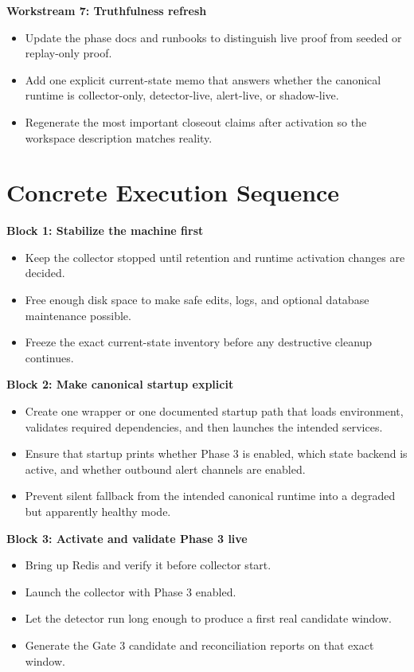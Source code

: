 \documentclass{article}
\begin{document}
\textbf{Workstream 7: Truthfulness refresh}
\begin{itemize}
\item Update the phase docs and runbooks to distinguish live proof from seeded or replay-only proof.
\item Add one explicit current-state memo that answers whether the canonical runtime is collector-only, detector-live, alert-live, or shadow-live.
\item Regenerate the most important closeout claims after activation so the workspace description matches reality.
\end{itemize}

\section*{Concrete Execution Sequence}
\textbf{Block 1: Stabilize the machine first}
\begin{itemize}
\item Keep the collector stopped until retention and runtime activation changes are decided.
\item Free enough disk space to make safe edits, logs, and optional database maintenance possible.
\item Freeze the exact current-state inventory before any destructive cleanup continues.
\end{itemize}

\textbf{Block 2: Make canonical startup explicit}
\begin{itemize}
\item Create one wrapper or one documented startup path that loads environment, validates required dependencies, and then launches the intended services.
\item Ensure that startup prints whether Phase 3 is enabled, which state backend is active, and whether outbound alert channels are enabled.
\item Prevent silent fallback from the intended canonical runtime into a degraded but apparently healthy mode.
\end{itemize}

\textbf{Block 3: Activate and validate Phase 3 live}
\begin{itemize}
\item Bring up Redis and verify it before collector start.
\item Launch the collector with Phase 3 enabled.
\item Let the detector run long enough to produce a first real candidate window.
\item Generate the Gate 3 candidate and reconciliation reports on that exact window.
\end{itemize}
\end{document}
